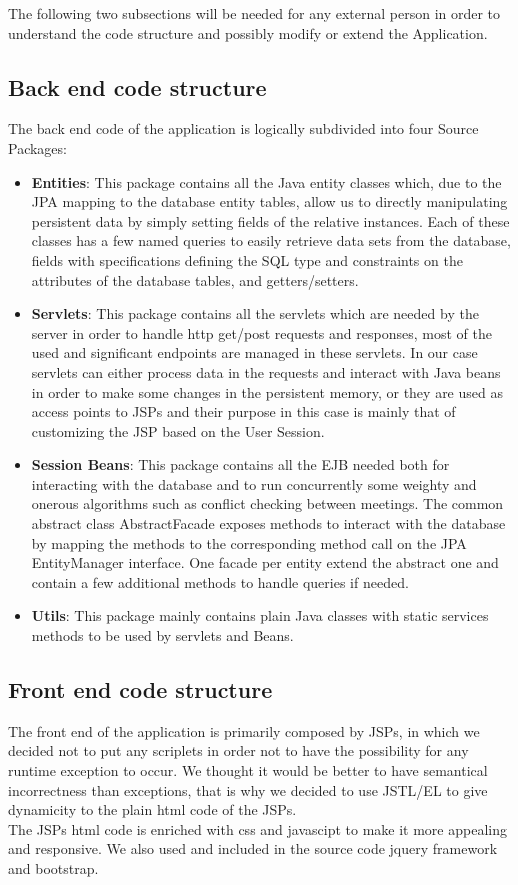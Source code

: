 The following two subsections will be needed for any external person in order to understand the code structure and possibly modify or extend the Application. 
\subsection{Back end code structure}
The back end code of the application is logically subdivided into four Source Packages:
\begin{itemize}
\item \textbf{Entities}: This package contains all the Java entity classes which, due to the JPA mapping to the database entity tables, allow us to directly manipulating persistent data by simply setting fields of the relative instances. Each of these classes has a few named queries to easily retrieve data sets from the database, fields with specifications defining the SQL type and constraints on the attributes of the database tables, and getters/setters.
\item \textbf{Servlets}: This package contains all the servlets which are needed by the server in order to handle http get/post requests and responses, most of the used and significant endpoints are managed in these servlets. In our case servlets can either process data in the requests and interact with Java beans in order to make some changes in the persistent memory, or they are used as access points to JSPs and their purpose in this case is mainly that of customizing the JSP based on the User Session.
\item \textbf{Session Beans}: This package contains all the EJB needed both for interacting with the database and to run concurrently some weighty and onerous algorithms such as conflict checking between meetings. The common abstract class AbstractFacade exposes methods to interact with the database by mapping the methods to the corresponding method call on the JPA EntityManager interface. One facade per entity extend the abstract one and contain a few additional methods to handle queries if needed.
\item \textbf{Utils}: This package mainly contains plain Java classes with static services methods to be used by servlets and Beans.
\end{itemize}

\subsection{Front end code structure}
The front end of the application is primarily composed by JSPs, in which we decided not to put any scriplets in order not to have the possibility for any runtime exception to occur. We thought it would be better to have semantical incorrectness than exceptions, that is why we decided to use JSTL/EL to give dynamicity to the plain html code of the JSPs.
\\The JSPs html code is enriched with css and javascipt to make it more appealing and responsive. We also used and included in the source code jquery framework and bootstrap.